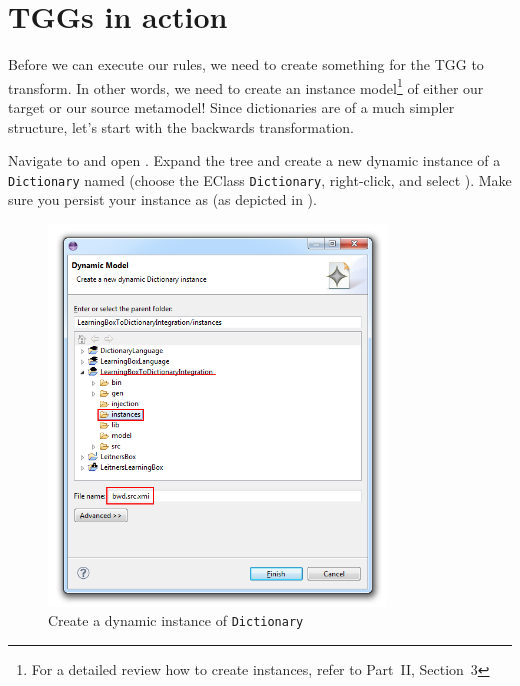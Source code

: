 \newpage
\section{TGGs in action}
\genHeader
\label{sect:TGGs_in_Action}

Before we can execute our rules, we need to create something for the TGG to transform. In other words, we need to create an instance model\footnote{For a
detailed review how to create instances, refer to Part~II, Section~3} of either our target or our source metamodel! Since dictionaries are of a much simpler structure, let's start with the backwards transformation.

\begin{stepbystep}

\item Navigate to  and open .
Expand the tree and create a new dynamic instance of a \texttt{Dictionary} named  (choose the EClass \texttt{Dictionary}, right-click, and select ). 
Make sure you persist your instance as  (as depicted in ).

\begin{figure}[htbp]
\begin{center}
  \includegraphics[width=0.8\textwidth]{../../org.moflon.doc.handbook.04_tripleGraphTransformations/5_inAction/aImages/eclipse_dictionaryInstance}
  \caption{Create a dynamic instance of \texttt{Dictionary}}
  \label{eclipse:create_instance_dict}
\end{center}
\end{figure}


\end{stepbystep}
